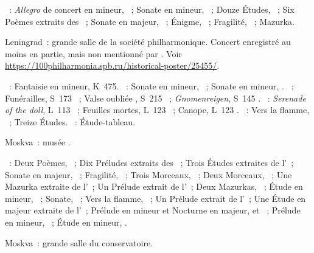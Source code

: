 \begin{description}
 \textsc{\Scriabine{}}~: \emph{Allegro} de concert en \kB \Flat mineur,
 ~; Sonate en \kF \Sharp mineur, ~; Douze Études,
 ~; Six Poèmes extraits des ~;
 Sonate en \kF \Sharp majeur, ~; Énigme,  ~;
 Fragilité,  ~; Mazurka.
 \item[\DateWithWeekDay{1952-02-03}]
 Leningrad~: grande salle de la société philharmonique.
 Concert enregistré au moins en partie, mais non mentionné par
 \citet[p.~434]{Scriabine}.
 Voir \href{https://100philharmonia.spb.ru/historical-poster/25455/}%
 {https://100philharmonia.spb.ru/historical-poster/25455/}.

 \textsc{\Mozart{}}~: Fantaisie en \kC mineur, K~475.
 \textsc{\Beethoven{}}~: Sonate en \kC \Sharp mineur,  ~;
 Sonate en \kC mineur, .
 \textsc{\Liszt{}}~: Funérailles, S~173 ~; Valse oubliée
 , S~215 ~; \emph{Gnomenreigen}, S~145 .
 \textsc{\Debussy{}}~: \emph{Serenade of the doll}, L~113 ~;
 Feuilles mortes, L~123 ~; Canope, L~123 .
 \textsc{\Scriabine{}}~: Vers la flamme, ~; Treize Études.
 \textsc{\Rachmaninov{}}~: Étude-tableau.
 \item[\DateWithWeekDay{1952-02-24}]
 Moskva~: musée \Scriabine{}.

 \textsc{\Scriabine{}}~: Deux Poèmes, ~; Dix Préludes extraits des
 ~; Trois Études extraites de l'~; Sonate en
 \kF \Sharp majeur, ~; Fragilité,  ~; Trois
 Morceaux, ~; Deux Morceaux, ~; Une Mazurka extraite de
 l'~; Un Prélude extrait de l'~; Deux Mazurkas,
 ~; Étude en \kC \Sharp mineur,  ~; Sonate,
 ~; Vers la flamme, ~; Un Prélude extrait de l'~;
 Une Étude en \kF \Sharp majeur extraite de l'~; Prélude en \kC
 \Sharp mineur et Nocturne en \kD \Flat majeur,   et
 ~; Prélude en \kE \Flat mineur,  ~; Étude en
 \kD \Sharp mineur,  .
 \item[\DateWithWeekDay{1952-03-02}]
 Moskva~: grande salle du conservatoire.


\end{description}
